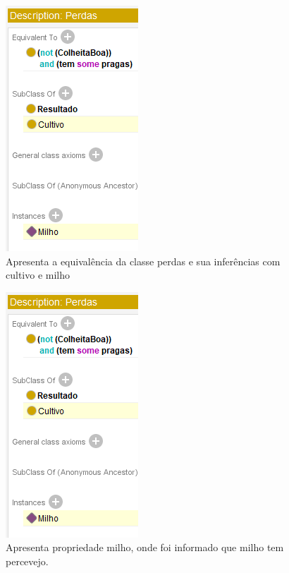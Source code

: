 \documentclass{article}
\begin{document}
    \begin{figure}[!htp]
        \centering %
        \includegraphics[width=.5\textwidth]{imagens/Inf_10.png} %
        \caption{Apresenta a equivalência da classe perdas e sua inferências com cultivo e milho}
        \label{figura:descPerdas}
    \end{figure}
    
    \begin{figure}[!htp]
        \centering %
        \includegraphics[width=.5\textwidth]{imagens/Inf_10.png} %
        \caption{Apresenta propriedade milho, onde foi informado que milho tem percevejo.}
        \label{figura:PropMilho}
    \end{figure}
    
\end{document}
